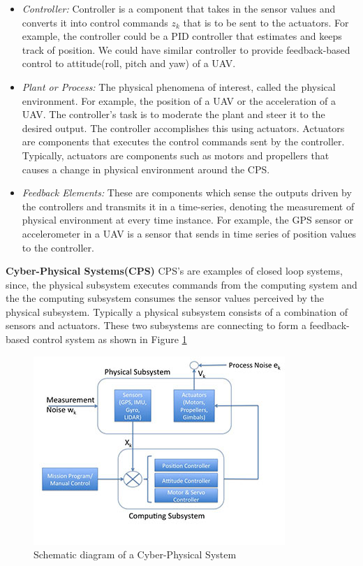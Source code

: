 \begin{itemize}
    \item \textit{Controller:} Controller is a component that takes in the sensor values and converts it into control commands $z_k$ that is to be sent to the actuators. For example, the controller could be a PID controller that estimates and keeps track of position. We could have similar controller to provide feedback-based control to attitude(roll, pitch and yaw) of a UAV.
	\item \textit{Plant or Process:} The physical phenomena of interest, called the physical environment. For example, the position of a UAV or the acceleration of a UAV. The controller's task is to moderate the plant and steer it to the desired output. The controller accomplishes this using actuators. Actuators are components that executes the control commands sent by the controller. Typically, actuators are components such as motors and propellers that causes a change in physical environment around the CPS.
	\item \textit{Feedback Elements:} These are components which sense the outputs driven by the controllers and transmits it in a time-series, denoting the measurement of physical environment at every time instance. For example, the GPS sensor or accelerometer in a UAV is a sensor that sends in time series of position values to the controller.
 

\end{itemize}

\textbf{Cyber-Physical Systems(CPS)} CPS's are examples of closed loop systems, since, the physical subsystem executes commands from the computing system and the the computing subsystem consumes the sensor values perceived by the physical subsystem. Typically a physical subsystem consists of a combination of sensors and actuators. These two subsystems are connecting to form a feedback-based control system as shown in Figure \ref{fig:cps}

\begin{figure}
    \includegraphics[scale=0.60]{images/cps-fig-small.jpg}
    \caption{Schematic diagram of a Cyber-Physical System}
    \label{fig:cps}
\end{figure}

